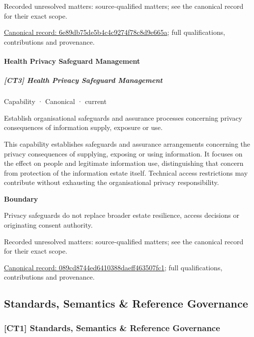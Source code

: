 {\small Recorded unresolved matters: source-qualified matters; see the canonical record for their exact scope.}\par
{\footnotesize \href{../../../../continuum/strategy/capability/6e89db75de5b4c4c9274f78c8d9e665a.md}{Canonical record: 6e89db75de5b4c4c9274f78c8d9e665a}; full qualifications, contributions and provenance.}\par
\paragraph{Health Privacy Safeguard Management}

\subparagraph{[CT3] Health Privacy Safeguard Management}

\label{element:089cd8744ed6410388daeff463507fc1}
{\small Capability · Canonical · current}\par

Establish organisational safeguards and assurance processes concerning privacy consequences of information supply, exposure or use.



This capability establishes safeguards and assurance arrangements concerning the privacy consequences of supplying, exposing or using information. It focuses on the effect on people and legitimate information use, distinguishing that concern from protection of the information estate itself. Technical access restrictions may contribute without exhausting the organisational privacy responsibility.



\textbf{Boundary}



Privacy safeguards do not replace broader estate resilience, access decisions or originating consent authority.


{\small Recorded unresolved matters: source-qualified matters; see the canonical record for their exact scope.}\par
{\footnotesize \href{../../../../continuum/strategy/capability/089cd8744ed6410388daeff463507fc1.md}{Canonical record: 089cd8744ed6410388daeff463507fc1}; full qualifications, contributions and provenance.}\par
\subsection{Standards, Semantics \& Reference Governance}

\subsubsection{[CT1] Standards, Semantics \& Reference Governance}

